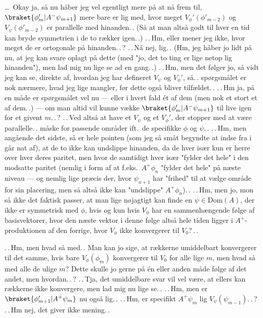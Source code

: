 \documentclass{report}
\begin{document}
\ldots\ Okay ja, så nu håber jeg vel egentligt mere på at nå frem til, $\braket{\phi'_{m} | A^- \psi_{m+1}}$ mere bare er lig med, hvor meget $V_\phi'(\phi'_{m-2})$ og $V_\psi(\phi'_{m-2})$ er parallelle med hinanden.\,. (Så at man altså godt til hver en tid kan bryde symmetrien i de to rækker igen.\,.) .\,.\,Hm, eller mener jeg ikke, hvor meget de er ortogonale på hinanden.\,.\,? .\,.\,Nå nej, lig.\,. (Hm, jeg håber jo lidt på nu, at jeg kan svare oplagt på dette (med "jo, det to ting er lige netop lig hinanden"), men lad mig nu lige se ad en gang.\,.) .\,.\,Hm, men det følger jo, så vidt jeg kan se, direkte af, hvordan jeg har defineret $V_\psi$ og $V_\phi'$, så.\,. spørgsmålet er nok nærmere, hvad jeg lige mangler, før dette også bliver tilfældet.\,. .\,.\,Hm ja, på en måde er spørgsmålet vel nu --- eller i hvert fald ét af dem (men nok et stort et af dem.\,.) --- om man altid vil kunne vække $\braket{\phi'_{m} | A^- \psi_{m+1}}$ til live igen for et givent $m$.\,.\,? .\,.\,Ved altså at have et $V_\psi$ og et $V_\phi'$, der stopper med at være parallelle.\,. måske for passende områder ift.\ de specifikke $\phi$ og $\psi$.\,. .\,.\,Hm, men angående det sidste, så er hele pointen (som jeg så småt begyndte at indse fra i går nat af), at de to ikke kan undslippe hinanden, da de hver især kun er herre over hver deres paritet, men hvor de samtidigt hver især "fylder det hele" i den modsatte paritet (nemlig i form af at f.eks.\ $A^+ \phi_n$ "fylder det hele" på næste niveau --- og nemlig lige præcis der, hvor $\psi_{n+1}$ har "frihed" til at vælge område for sin placering, men så altså ikke kan "undslippe" $A^+ \phi_n$).\,. .\,.\,Hm, men jo, mon så ikke det faktisk passer, at man lige nøjagtigt kan finde en $\psi\in\mathrm{Dom}(A)$, der ikke er symmetrisk med $\phi$, hvis og kun hvis $V_\phi$ har en sammenhængende følge af basisvektorer, hvor den næste vektor i denne følge altså hele tiden ligger i $A^+$-produktionen af den forrige, hvor $V_\phi$ ikke konvergerer til $V_0$?\,.\,.

.\,.\,Hm, men hvad så med.\,. Man kan jo sige, at rækkerne umiddelbart konvergerer til det samme, hvis bare $V_\phi(\phi_{m})$ konvergerer til $V_0$ for alle lige $m$, men hvad så med alle de ulige $m$? Dette skulle jo gerne på én eller anden måde følge af det andet, men hvordan.\,.\,? .\,.\,Tja, det umiddelbare svar vil vel være, at ellers kan rækkerne ikke konvergere, men lad mig nu lige se.\,. .\,.\,Hm, men er $\braket{\phi'_{m+1}   | A^+ \psi_{m}}$ nu også lig.\,. .\,.\,Hm, er specifikt $A^+ \psi_m$ lig $V_\psi(\psi_{m-1})$.\,.\,? .\,.\,Hm nej, det giver ikke mening.\,. 
\end{document}

